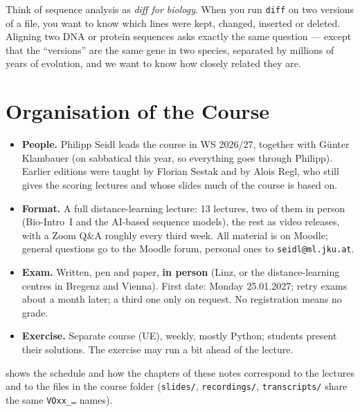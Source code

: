\documentclass[11pt, oneside]{book}
\let\originalsection\section
\renewcommand{\section}{\Needspace{7\baselineskip}\originalsection}
\begin{document}
\begin{intbox}
Think of sequence analysis as \emph{diff for biology}. When you run
\texttt{diff} on two versions of a file, you want to know which lines were
kept, changed, inserted or deleted. Aligning two DNA or protein sequences
asks exactly the same question --- except that the ``versions'' are the
same gene in two species, separated by millions of years of evolution, and
we want to know how closely related they are.
\end{intbox}

\section{Organisation of the Course}

\begin{itemize}
  \item \textbf{People.} Philipp Seidl leads the course in WS 2026/27,
    together with Günter Klambauer (on sabbatical this year, so everything
    goes through Philipp). Earlier editions were taught by Florian Sestak and
    by Alois Regl, who still gives the scoring lectures and whose slides much
    of the course is based on.
  \item \textbf{Format.} A full distance-learning lecture: 13 lectures, two of
    them in person (Bio-Intro~I and the AI-based sequence models), the rest as
    video releases, with a Zoom Q\&A roughly every third week. All material
    is on Moodle; general questions go to the Moodle forum, personal ones to
    \texttt{seidl@ml.jku.at}.
  \item \textbf{Exam.} Written, pen and paper, \textbf{in person} (Linz, or
    the distance-learning centres in Bregenz and Vienna). First date: Monday
    25.01.2027; retry exams about a month later; a third one only on request.
    No registration means no grade.
  \item \textbf{Exercise.} Separate course (UE), weekly, mostly Python;
    students present their solutions. The exercise may run a bit ahead of
    the lecture.
\end{itemize}

 shows the schedule and how the chapters of these notes
correspond to the lectures and to the files in the course folder
(\texttt{slides/}, \texttt{recordings/}, \texttt{transcripts/} share the same
\texttt{VOxx\_\ldots} names).
\end{document}
